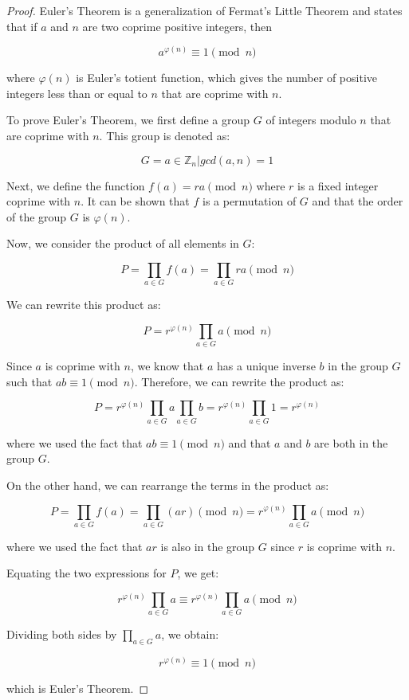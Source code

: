 \documentclass[12pt,openany]{book}
\begin{document}
	\begin{proof}
		Euler's Theorem is a generalization of Fermat's Little Theorem and states that if $a$ and $n$ are two coprime positive integers, then
		
		$$a^{\varphi(n)} \equiv 1 \pmod{n}$$
		
		where $\varphi(n)$ is Euler's totient function, which gives the number of positive integers less than or equal to $n$ that are coprime with $n$.
		
		To prove Euler's Theorem, we first define a group $G$ of integers modulo $n$ that are coprime with $n$. This group is denoted as:
		
		$$G = {a \in \mathbb{Z}_n | gcd(a,n)=1}$$
		
		Next, we define the function $f(a) = ra \pmod{n}$ where $r$ is a fixed integer coprime with $n$. It can be shown that $f$ is a permutation of $G$ and that the order of the group $G$ is $\varphi(n)$.
		
		Now, we consider the product of all elements in $G$:
		
		$$P = \prod_{a \in G} f(a) = \prod_{a \in G} ra \pmod{n}$$
		
		We can rewrite this product as:
		
		$$P = r^{\varphi(n)} \prod_{a \in G} a \pmod{n}$$
		
		Since $a$ is coprime with $n$, we know that $a$ has a unique inverse $b$ in the group $G$ such that $ab \equiv 1 \pmod{n}$. Therefore, we can rewrite the product as:
		
		$$P = r^{\varphi(n)} \prod_{a \in G} a \prod_{a \in G} b = r^{\varphi(n)} \prod_{a \in G} 1 = r^{\varphi(n)}$$
		
		where we used the fact that $ab \equiv 1 \pmod{n}$ and that $a$ and $b$ are both in the group $G$.
		
		On the other hand, we can rearrange the terms in the product as:
		
		$$P = \prod_{a \in G} f(a) = \prod_{a \in G} (ar) \pmod{n} = r^{\varphi(n)} \prod_{a \in G} a \pmod{n}$$
		
		where we used the fact that $ar$ is also in the group $G$ since $r$ is coprime with $n$.
		
		Equating the two expressions for $P$, we get:
		
		$$r^{\varphi(n)} \prod_{a \in G} a \equiv r^{\varphi(n)} \prod_{a \in G} a \pmod{n}$$
		
		Dividing both sides by $\prod_{a \in G} a$, we obtain:
		
		$$r^{\varphi(n)} \equiv 1 \pmod{n}$$
		
		which is Euler's Theorem.
	\end{proof}
	
\end{document}
